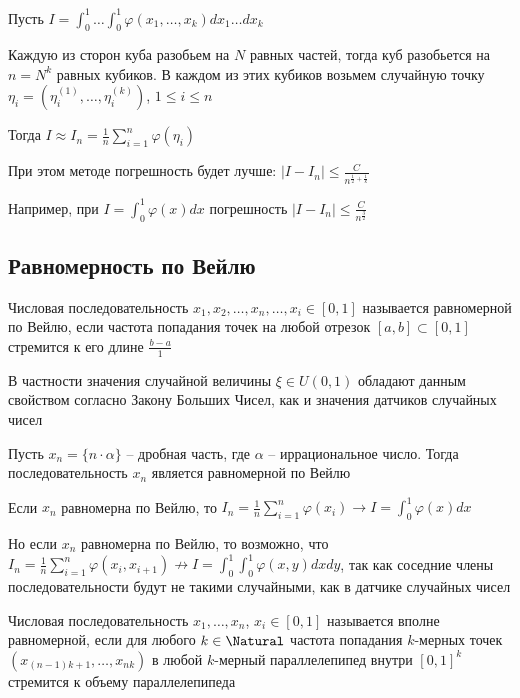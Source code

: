 \hypertarget{monte_carlo_2}{}

Пусть $I = \int_0^1 \dots \int_0^1 \varphi(x_1, \dots, x_k) dx_1 \dots dx_k$

Каждую из сторон куба разобьем на $N$ равных частей, тогда куб разобьется на $n = N^k$ равных кубиков. В каждом из этих кубиков возьмем случайную точку $\eta_i = (\eta_i^{(1)}, \dots, \eta_i^{(k)})$, $1 \leq i \leq n$

Тогда $I \approx I_n = \frac{1}{n} \sum_{i = 1}^n \varphi(\eta_i)$

При этом методе погрешность будет лучше: $|I - I_n| \leq \frac{C}{n^{\frac{1}{2} + \frac{1}{k}}}$

Например, при $I = \int_0^1 \varphi(x) dx$ погрешность $|I - I_n| \leq \frac{C}{n^\frac{3}{2}}$

\subsection{Равномерность по Вейлю}

\Def Числовая последовательность $x_1, x_2, \dots, x_n, \dots, x_i \in [0, 1]$ называется равномерной по Вейлю, если частота попадания точек на любой отрезок $[a, b] \subset [0, 1]$ стремится к его длине $\frac{b - a}{1}$

В частности значения случайной величины $\xi \in U(0, 1)$ обладают данным свойством согласно Закону Больших Чисел, как и значения датчиков случайных чисел 

\begin{MyTheorem}
    \Ths Пусть $x_n = \{n \cdot \alpha\}$ -- дробная часть, где $\alpha$ -- иррациональное число. Тогда последовательность $x_n$ является равномерной по Вейлю
\end{MyTheorem}

Если $x_n$ равномерна по Вейлю, то $I_n = \frac{1}{n} \sum_{i = 1}^n \varphi(x_i) \longrightarrow I = \int_0^1 \varphi(x) dx$

\Nota Но если $x_n$ равномерна по Вейлю, то возможно, что $I_n = \frac{1}{n} \sum_{i = 1}^n \varphi(x_i, x_{i + 1}) \not\longrightarrow I = \int_0^1 \int_0^1 \varphi(x, y) dx dy$, так как соседние члены последовательности будут не такими случайными, как в датчике случайных чисел 

\Def Числовая последовательность $x_1, \dots, x_n$, $x_i \in [0, 1]$ называется вполне равномерной, если для любого $k \in \Natural$ частота попадания $k$-мерных точек $(x_{(n - 1) k + 1}, \dots, x_{nk})$ в любой $k$-мерный параллелепипед внутри $[0, 1]^k$ стремится к объему параллелепипеда

